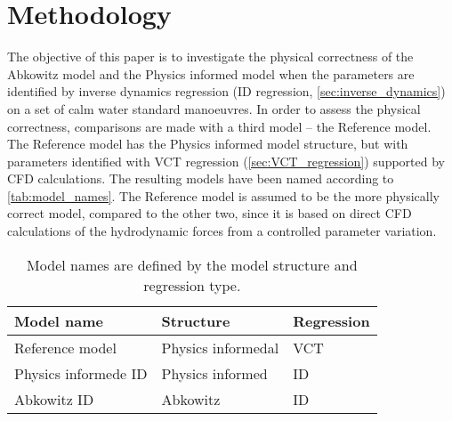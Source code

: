 \section{Methodology}
\label{sec:methodology}
The objective of this paper is to investigate the physical correctness of the Abkowitz model and the Physics informed model when the parameters are identified by inverse dynamics regression (ID regression, \autoref{sec:inverse_dynamics}) on a set of calm water standard manoeuvres. In order to assess the physical correctness, comparisons are made with a third model -- the Reference model. The Reference model has the Physics informed model structure, but with parameters identified with VCT regression (\autoref{sec:VCT_regression}) supported by CFD calculations. The resulting models have been named according to \autoref{tab:model_names}.
The Reference model is assumed to be the more physically correct model, compared to the other two, since it is based on direct CFD calculations of the hydrodynamic forces from a controlled parameter variation.
\begin{table}[h]
    \caption{Model names are defined by the model structure and regression type.}
    \label{tab:model_names}
    \centering
    \begin{tabular}{l l l}
        Model name                           & Structure      & Regression \\
        \hline
        Reference model & Physics informedal & VCT                         \\
        Physics informede ID  & Physics informed & ID         \\
        Abkowitz ID                          & Abkowitz       & ID         \\
    \end{tabular}
\end{table}

\FloatBarrier
